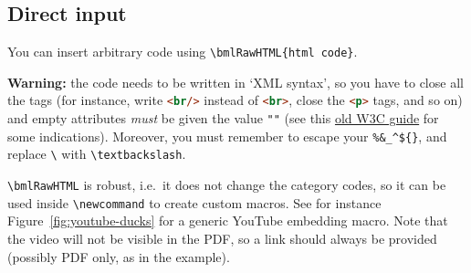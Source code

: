 \documentclass[a4paper,british]{article}
\def\ltxinline{\lstinline[style=bookml]}
\def\htmlinline{\lstinline[language=html]}
\begin{document}
\subsection{Direct \HTML{} input}

You can insert arbitrary \HTML{} code using \ltxinline|\bmlRawHTML{html code}|.

\textbf{Warning:} the \HTML{} code needs to be written in `XML syntax', so you have to close all the tags (for instance, write \htmlinline|<br/>| instead of \htmlinline|<br>|, close the \htmlinline|<p>| tags, and so on) and empty attributes \emph{must} be given the value \htmlinline|""| (see this \href{https://dev.w3.org/html5/html-author/#elements}{old W3C guide} for some indications). Moreover, you must remember to escape your \ltxinline|%

\ltxinline|\bmlRawHTML| is robust, i.e.\ it does not change the category codes, so it can be used inside \ltxinline|\newcommand| to create custom macros. See for instance Figure~\ref{fig:youtube-ducks} for a generic YouTube embedding macro. Note that the video will not be visible in the PDF, so a link should always be provided (possibly PDF only, as in the example).
\end{document}
